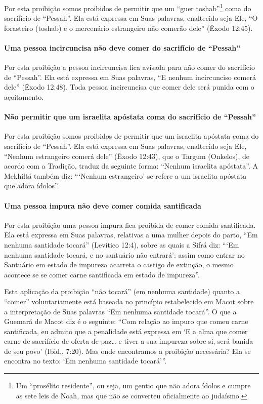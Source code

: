 Por esta proibição somos proibidos de permitir que um ``guer
toshab''\footnote{Um ``prosélito residente'', ou seja, um gentio que não adora
ídolos e cumpre as sete leis de Noah, mas que não se converteu
oficialmente ao judaísmo.} coma do sacrifício de ``Pessah''. Ela
está expressa em Suas palavras, enaltecido seja Ele, ``O forasteiro
(toshab) e o mercenário estrangeiro não comerão dele'' (Êxodo 12:45).

\paragraph{Uma pessoa incircuncisa não deve comer do sacrifício de ``Pessah''}

Por esta proibição a pessoa incircuncisa fica avisada para não comer do
sacrifício de ``Pessah''. Ela está expressa em Suas palavras, ``E nenhum
incircunciso comerá dele'' (Êxodo 12:48). Toda pessoa incircuncisa que
comer dele será punida com o açoitamento.

\paragraph{Não permitir que um israelita apóstata coma do sacrifício de ``Pessah''}

Por esta proibição somos proibidos de permitir que um israelita
apóstata coma do sacrifício de ``Pessah''. Ela está expressa em Suas
palavras, enaltecido seja Ele, ``Nenhum estrangeiro comerá dele''
(Êxodo 12:43), que o Targum
(Onkelos), de acordo com a Tradição, traduz da seguinte forma: ``Nenhum
israelita apóstata''. A Mekhiltá também diz: ```Nenhum estrangeiro' se
refere a um israelita apóstata que adora ídolos''.

\paragraph{Uma pessoa impura não deve comer comida santificada}

Por esta proibição uma pessoa impura fica proibida de comer comida
santificada. Ela está expressa em Suas palavras, relativas a uma mulher
depois do parto, ``Em nenhuma santidade tocará'' (Levítico 12:4), sobre
as quais a Sifrá diz: ```Em nenhuma santidade tocará, e no santuário não
entrará': assim como entrar no Santuário em estado de impureza acarreta
o castigo de extinção, o mesmo acontece se se comer carne santificada em
estado de impureza''.

Esta aplicação da proibição ``não tocará'' (em nenhuma santidade) quanto
a ``comer'' voluntariamente está baseada no princípio estabelecido em
Macot sobre a interpretação de Suas palavras ``Em nenhuma santidade
tocará''. O que a Guemará de Macot diz é o seguinte: ``Com relação ao
impuro que comeu carne santificada, eu admito que a penalidade está
expressa em `E a alma que comer carne de sacrifício de oferta de paz\ldots{}
e tiver a sua impureza sobre si, será banida de seu povo' (Ibid., 7:20).
Mas onde encontramos a proibição necessária? Ela se encontra no texto:
`Em nenhuma santidade tocará'''.


